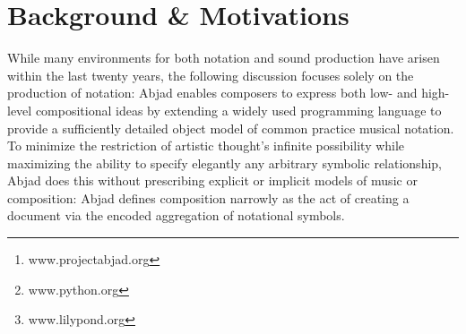 \documentclass{article}
\title{\papertitle}
\begin{document}
\capstartfalse
\maketitle
\capstarttrue

\begin{abstract}
Abjad\footnote{www.projectabjad.org} is an interactive open-source software
system designed to help composers build up complex pieces of music notation in
an iterative and incremental way.  Abjad is implemented in the
Python\footnote{www.python.org} programming language and architected as an
object-oriented collection of packages, classes and functions. Composers can
visualize their work as publication-quality score at all stages of the
compositional process using Abjad's interface to the
LilyPond\footnote{www.lilypond.org} music notation package. Although the first
versions of Abjad were implemented in 1997 and the project website is now
visited thousands of times each month, we have never documented the design
priorities that have guided us as we have built the system. In this paper we
detail some of the most important principles we have followed in our work
architecting Abjad. The priorities we document here arise in answer to
domain-specific questions of music modeling (what are the fundamental elements
of music notation? which elements of music notation should be modeled
hierarchically? which programming constructs are available to help model the
temporal relationships arising between entities in musical score?) as well as
in consideration of the ways in which best practices taken from software
engineering can apply to the development of a music software system like ours
(which programming concepts concerning things like iteration, aggregation and
encapsulation make sense to make available to composers? which existing tools
to test, document and deploy other open-source projects are available to help
develop a music software system like Abjad?). In the sections that follow we
discuss the background and motivations that lead us to ask questions like these
and then elaborate the design priorities we have arrived at in our ongoing work
architecting Abjad.
\end{abstract}

\section{Background \& Motivations}\label{sec:background}

While many environments for both notation and sound production have arisen
within the last twenty years, the following discussion focuses solely on the
production of notation: Abjad enables composers to express both low- and
high-level compositional ideas by extending a widely used programming language
to provide a sufficiently detailed object model of common practice musical
notation. To minimize the restriction of artistic thought's infinite
possibility while maximizing the ability to specify elegantly any arbitrary
symbolic relationship, Abjad does this without prescribing explicit or implicit
models of music or composition: Abjad defines composition narrowly as the act
of creating a document via the encoded aggregation of notational symbols.
\end{document}
